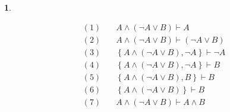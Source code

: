 \documentclass[a4paper, 12pt]{ctexbook} %
\theoremstyle{plain}
\theoremstyle{definition}
\newtheorem{problem}{}
\theoremstyle{remark}
\begin{document}
\begin{problem}
\begin{enumerate}
\begin{align*}
    (1)\quad &A \wedge \left(\neg A \vee B \right) \vdash  A \tag{$\wedge  - $} \\ 
    (2)\quad &A \wedge \left(\neg A \vee B \right) \vdash   \left(\neg A \vee B \right) \tag{$\wedge -$} \\
    (3)\quad &\left\{ A \wedge \left(\neg A \vee B \right) ,  \neg A \right\}  \vdash  \neg A \tag{$\in$} \\
    (4)\quad &\left\{ A \wedge \left(\neg A \vee B\right) , \neg A \right\} \vdash  B \tag{(1) (3) $\neg -$} \\
    (5)\quad &\left\{ A \wedge \left(\neg A \vee B \right) , B \right\} \vdash  B \tag{$\in$} \\
    (6)\quad &\left\{A \wedge \left(\neg A \vee B \right)\right\} \vdash B \tag{$(2)(4)(5) \vee - $} \\
    (7)\quad &A\wedge \left(\neg A \vee B \right) \vdash A \wedge B \tag{$(1)(6) , \wedge +$ } 
\end{align*}
\end{enumerate}
\end{problem}
\end{document}
